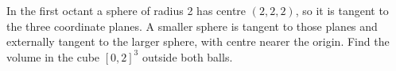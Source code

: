 In the first octant a sphere of radius 2 has centre $(2,2,2)$, so it is tangent to the three coordinate planes. A smaller sphere is tangent to those planes and externally tangent to the larger sphere, with centre nearer the origin. Find the volume in the cube $[0,2]^3$ outside both balls.
